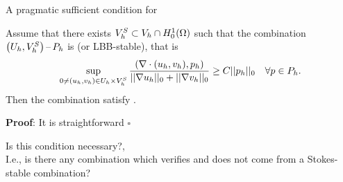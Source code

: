 \begin{frame}{A pragmatic sufficient condition for \ISph}

  \begin{lemma}
  \label{lemma:sufficient.condition.stokes.IS2}
  Assume that there exists $V_h^S\subset V_h\cap H_0^1(\Omega)$ such
  that the combination $\mbox{\ensuremath{\big(U_h,V_h^S\big)\,}\mbox{--}\ensuremath{\,P_h}}$ is
  \xspace (or LBB-stable), that is
    \begin{equation*}
      \sup_{0\neq (u_{h},v_{h})\in U_h\times V_h^S}
      \frac{(\nabla\cdot{}(u_{h},v_{h}),p_{h})}{||\nabla u_{h}||_0+||\nabla v_{h}||_0}
      \ge C ||p_{h}||_0 \quad\forall p\in P_h.
    \end{equation*}
    Then the combination \FEthreeSpaces\Uh\Vh\Ph satisfy \ISph.
  \end{lemma}

  \textbf{Proof}: It is straightforward \hfill $\square$

  \begin{remark}
    Is this condition necessary?,
    \\[0.3em]
    I.e., is there any combination \FEthreeSpaces\Uh\Vh\Ph which
    verifies \ISph and does not come from a Stokes-stable
    combination?
  \end{remark}
\end{frame}

